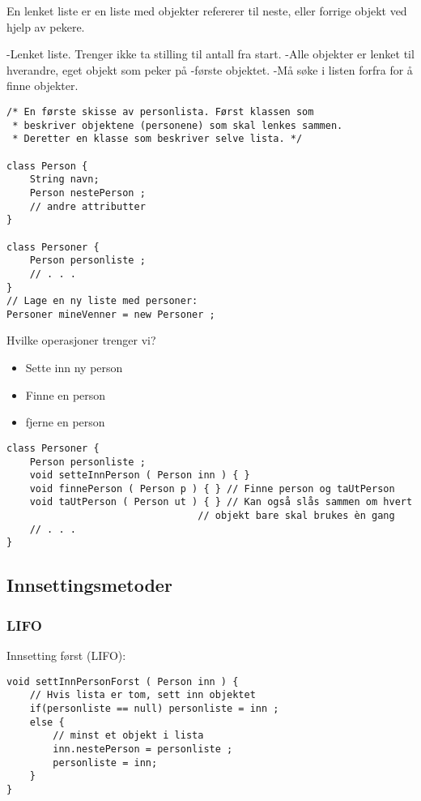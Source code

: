 \documentclass[a4paper,norsk,10pt]{article}
\begin{document}
En lenket liste er en liste med objekter refererer til neste, eller forrige objekt ved hjelp av pekere.

-Lenket liste. Trenger ikke ta stilling til antall fra start.
-Alle objekter er lenket til hverandre, eget objekt som peker på
-første objektet.
-Må søke i listen forfra for å finne objekter.


\begin{verbatim}
/* En første skisse av personlista. Først klassen som
 * beskriver objektene (personene) som skal lenkes sammen.
 * Deretter en klasse som beskriver selve lista. */

class Person {
    String navn;
    Person nestePerson ;
    // andre attributter
}

class Personer {
    Person personliste ;
    // . . .
}
// Lage en ny liste med personer:
Personer mineVenner = new Personer ;
\end{verbatim}

Hvilke operasjoner trenger vi?
\begin{itemize}
\item Sette inn ny person
\item Finne en person
\item fjerne en person
\end{itemize}

\begin{verbatim}
class Personer {
    Person personliste ;
    void setteInnPerson ( Person inn ) { }
    void finnePerson ( Person p ) { } // Finne person og taUtPerson
    void taUtPerson ( Person ut ) { } // Kan også slås sammen om hvert 
                                 // objekt bare skal brukes èn gang
    // . . .
}
\end{verbatim}
\subsection{Innsettingsmetoder}
\label{sec-8.2}
\subsubsection{LIFO}
\label{sec-8.2.1}

Innsetting først (LIFO):

\begin{verbatim}
void settInnPersonForst ( Person inn ) {
    // Hvis lista er tom, sett inn objektet
    if(personliste == null) personliste = inn ;
    else {
        // minst et objekt i lista
        inn.nestePerson = personliste ;
        personliste = inn;
    }
}
\end{verbatim}
\end{document}
